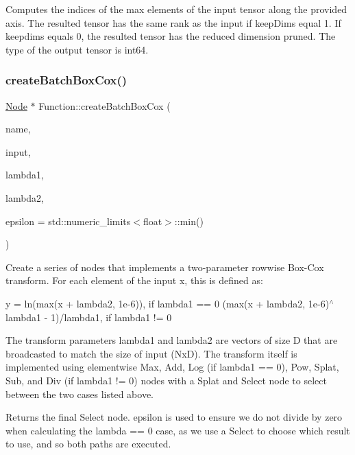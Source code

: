 Computes the indices of the max elements of the input tensor along the provided {\ttfamily axis}. The resulted tensor has the same rank as the input if {\ttfamily keep\+Dims} equal 1. If {\ttfamily keepdims} equals 0, the resulted tensor has the reduced dimension pruned. The type of the output tensor is int64. \mbox{\label{classglow_1_1_function_ad6329d3a8eb625ebd0a6b8f77762801f}} 
\subsubsection{\texorpdfstring{create\+Batch\+Box\+Cox()}{createBatchBoxCox()}}
{\footnotesize\ttfamily \hyperlink{classglow_1_1_node}{Node} $\ast$ Function\+::create\+Batch\+Box\+Cox (\begin{DoxyParamCaption}\item[{llvm\+::\+String\+Ref}]{name,  }\item[{\hyperlink{structglow_1_1_node_value}{Node\+Value}}]{input,  }\item[{\hyperlink{structglow_1_1_node_value}{Node\+Value}}]{lambda1,  }\item[{\hyperlink{structglow_1_1_node_value}{Node\+Value}}]{lambda2,  }\item[{float}]{epsilon = {\ttfamily std\+:\+:numeric\+\_\+limits$<$float$>$\+:\+:min()} }\end{DoxyParamCaption})}

Create a series of nodes that implements a two-\/parameter rowwise Box-\/\+Cox transform. For each element of the {\ttfamily input} x, this is defined as\+:

y = ln(max(x + lambda2, 1e-\/6)), if lambda1 == 0 (max(x + lambda2, 1e-\/6)$^\wedge$lambda1 -\/ 1)/lambda1, if lambda1 != 0

The transform parameters {\ttfamily lambda1} and {\ttfamily lambda2} are vectors of size D that are broadcasted to match the size of {\ttfamily input} (NxD). The transform itself is implemented using elementwise Max, Add, Log (if lambda1 == 0), Pow, Splat, Sub, and Div (if lambda1 != 0) nodes with a Splat and Select node to select between the two cases listed above. \begin{DoxyReturn}{Returns}
the final Select node. {\ttfamily epsilon} is used to ensure we do not divide by zero when calculating the lambda == 0 case, as we use a Select to choose which result to use, and so both paths are executed. 
\end{DoxyReturn}
\mbox{\label{classglow_1_1_function_a2c5f3c2af2648d3581dcb308ce2717f2}} 
